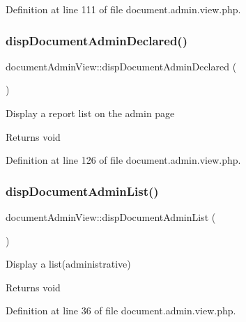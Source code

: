 Definition at line 111 of file document.\+admin.\+view.\+php.

\hypertarget{classdocumentAdminView_ad94b3d2db90d0912e4f24a1efb9bff46}{}\label{classdocumentAdminView_ad94b3d2db90d0912e4f24a1efb9bff46} 
\subsubsection{\texorpdfstring{disp\+Document\+Admin\+Declared()}{dispDocumentAdminDeclared()}}
{\footnotesize\ttfamily document\+Admin\+View\+::disp\+Document\+Admin\+Declared (\begin{DoxyParamCaption}{ }\end{DoxyParamCaption})}

Display a report list on the admin page \begin{DoxyReturn}{Returns}
void 
\end{DoxyReturn}


Definition at line 126 of file document.\+admin.\+view.\+php.

\hypertarget{classdocumentAdminView_a522a3fbd85960249d098fd1b8e5a0117}{}\label{classdocumentAdminView_a522a3fbd85960249d098fd1b8e5a0117} 
\subsubsection{\texorpdfstring{disp\+Document\+Admin\+List()}{dispDocumentAdminList()}}
{\footnotesize\ttfamily document\+Admin\+View\+::disp\+Document\+Admin\+List (\begin{DoxyParamCaption}{ }\end{DoxyParamCaption})}

Display a list(administrative) \begin{DoxyReturn}{Returns}
void 
\end{DoxyReturn}


Definition at line 36 of file document.\+admin.\+view.\+php.

\hypertarget{classdocumentAdminView_a677a59c8ecf38161449f397e85f22fa4}{}\label{classdocumentAdminView_a677a59c8ecf38161449f397e85f22fa4} 
